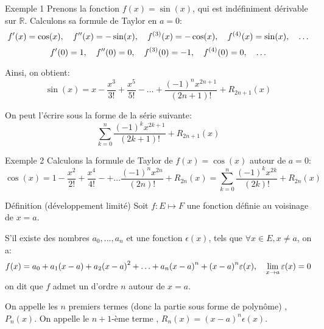 \documentclass[a4paper]{article}
\begin{document}
\begin{parag}{Exemple 1}
    Prenons la fonction $f\left(x\right) = \sin\left(x\right)$, qui est indéfiniment dérivable sur $\mathbb{R}$. Calculons sa formule de Taylor en $a = 0$:
    \[f'\left(x\right) = \cos\left(x\right), \mathspace f''\left(x\right) = -\sin\left(x\right), \mathspace f^{\left(3\right)}\left(x\right) = -\cos\left(x\right), \mathspace f^{\left(4\right)}\left(x\right) = \sin\left(x\right), \mathspace \ldots\]
    \[f'\left(0\right) = 1, \mathspace f''\left(0\right) = 0, \mathspace f^{\left(3\right)}\left(0\right) = -1, \mathspace f^{\left(4\right)}\left(0\right) = 0, \mathspace \ldots\]

    Ainsi, on obtient:
    \[\sin\left(x\right) = x - \frac{x^{3}}{3!} + \frac{x^{5}}{5!} - \ldots + \frac{\left(-1\right)^{n} x^{2n + 1}}{\left(2n + 1\right)!} + R_{2n+1}\left(x\right)\]

    On peut l'écrire sous la forme de la série suivante:
    \[\sum_{k=0}^{n} \frac{\left(-1\right)^{k} x^{2k+1}}{\left(2k + 1\right)!} + R_{2n + 1}\left(x\right)\]
\end{parag}

\begin{parag}{Exemple 2}
    Calculons la formule de Taylor de $f\left(x\right) = \cos\left(x\right)$ autour de $a = 0$:
    \[\cos\left(x\right) = 1 - \frac{x^2}{2!} + \frac{x^{4}}{4!} - + \ldots \frac{\left(-1\right)^{n} x^{2n}}{\left(2n\right)!} + R_{2n}\left(x\right) = \sum_{k=0}^{n} \frac{\left(-1\right)^{k} x^{2k}}{\left(2k\right)!} + R_{2n}\left(x\right)\]
\end{parag}

\begin{parag}{Définition (développement limité)}
    Soit $f : E\mapsto F$ une fonction définie au voisinage de $x = a$.

    S'il existe des nombres $a_0, \ldots, a_n$ et une fonction $\epsilon\left(x\right)$, tels que $\forall x \in E, x \neq a$, on a:
    \[f\left(x\right) = a_0 + a_1\left(x - a\right) + a_2\left(x - a\right)^2 + \ldots + a_n\left(x - a\right)^n + \left(x - a\right)^{n} \epsilon\left(x\right), \mathspace \lim_{x \to a} \epsilon\left(x\right) = 0\]
    on dit que $f$ admet un  d'ordre $n$ autour de $x = a$.

    On appelle les $n$ premiers termes (donc la partie sous forme de polynôme) , $P_n\left(x\right)$. On appelle le $n+1$-ème terme , $R_n\left(x\right) = \left(x-a\right)^{n} \epsilon\left(x\right)$.
\end{parag}
\end{document}
